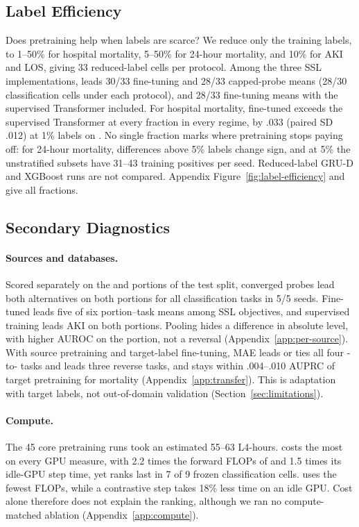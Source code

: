\subsection{Label Efficiency}
\label{sec:label-efficiency}

Does pretraining help when labels are scarce? We reduce only the training labels, to 1--50\% for hospital mortality, 5--50\% for 24-hour mortality, and 10\% for AKI and LOS, giving 33 reduced-label cells per protocol. Among the three SSL implementations, \MAE{} leads 30/33 fine-tuning and 28/33 capped-probe means (28/30 classification cells under each protocol), and 28/33 fine-tuning means with the supervised Transformer included. For hospital mortality, fine-tuned \MAE{} exceeds the supervised Transformer at every fraction in every regime, by .033 (paired SD .012) at 1\% labels on \Combined{}. No single fraction marks where pretraining stops paying off: for \MIMIC{} 24-hour mortality, differences above 5\% labels change sign, and at 5\% the unstratified subsets have 31--43 training positives per seed. Reduced-label GRU-D and XGBoost runs are not compared. Appendix Figure~\ref{fig:label-efficiency} and  give all fractions.

\subsection{Secondary Diagnostics}
\label{sec:secondary}

\paragraph{Sources and databases.}
Scored separately on the \MIMIC{} and \EICU{} portions of the \Combined{} test split, converged \MAE{} probes lead both alternatives on both portions for all classification tasks in 5/5 seeds. Fine-tuned \MAE{} leads five of six portion--task means among SSL objectives, and supervised training leads AKI on both portions. Pooling hides a difference in absolute level, with higher AUROC on the \MIMIC{} portion, not a reversal (Appendix~\ref{app:per-source}). With source pretraining and target-label fine-tuning, MAE leads or ties all four \MIMIC{}-to-\EICU{} tasks and leads three reverse tasks, and stays within .004--.010 AUPRC of target pretraining for mortality (Appendix~\ref{app:transfer}). This is adaptation with target labels, not out-of-domain validation (Section~\ref{sec:limitations}).

\paragraph{Compute.}
The 45 core pretraining runs took an estimated 55--63 L4-hours. \JEPA{} costs the most on every GPU measure, with 2.2 times the forward FLOPs of \MAE{} and 1.5 times its idle-GPU step time, yet ranks last in 7 of 9 frozen classification cells. \MAE{} uses the fewest FLOPs, while a contrastive step takes 18\% less time on an idle GPU. Cost alone therefore does not explain the ranking, although we ran no compute-matched ablation (Appendix~\ref{app:compute}).

